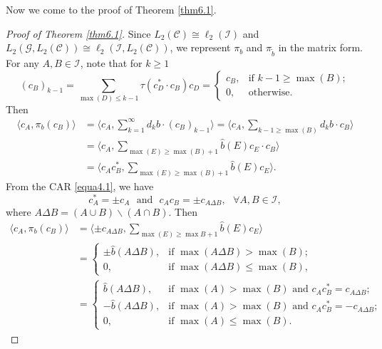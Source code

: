 \documentclass[oneside,english,a4wide]{amsart}
\numberwithin{equation}{section}
\numberwithin{figure}{section}
\theoremstyle{plain}
\theoremstyle{plain}
\theoremstyle{definition}
\theoremstyle{plain}
\theoremstyle{remark}
\theoremstyle{definition}
\theoremstyle{remark}
\theoremstyle{definition}
\newcommand{\8}{\infty}
\begin{document}
	Now we come to the proof of Theorem \ref{thm6.1}.
	\begin{proof}[Proof of Theorem \ref{thm6.1}]
		Since $L_2(\mathcal{C})\cong \ell_2(\mathcal{I})$ and $L_2(\mathcal{G},L_2(\mathcal{C}))\cong \ell_2(\mathcal{I}, L_2(\mathcal{C}))$, we represent $\pi_b$ and $\pi_{\tilde{b}}$ in the matrix form. For any $A,B\in\mathcal{I}$, note that for $k\geq 1$
		\begin{equation*}
			(c_B)_{k-1}=\sum_{\max(D)\le k-1}\tau(c_D^*\cdot c_B)c_D=
			\begin{cases}
				c_B,& \text{if $k-1\ge \max(B)$};\\
				0,& \text{otherwise}.
			\end{cases}
		\end{equation*}
		Then
		\begin{equation*}
			\begin{aligned}
				\langle c_A,\pi_b (c_B)\rangle{}&=\langle c_A,\sum_{k=1}^\infty d_kb\cdot(c_B)_{k-1}\rangle=\langle c_A,\sum_{k-1\ge \max(B)}d_kb\cdot c_B\rangle\\&=\langle c_A,\sum_{\max (E)\ge \max(B)+1}\hat{b}(E)c_E\cdot c_B\rangle\\&=\langle c_Ac_B^*,\sum_{\max (E)\ge \max(B)+1}\hat{b}(E)c_E\rangle.
			\end{aligned}
		\end{equation*}
		From the CAR \eqref{equa4.1}, we have 
		\[c_A^*=\pm c_A\,\,\,\,\mathrm{and}\,\,\,\,c_Ac_B=\pm c_{A\Delta B},\,\,\,\, \forall A,B\in\mathcal{I},\]
		where $A\Delta B=(A\cup B)\backslash(A\cap B)$. Then
		\begin{equation*}
			\begin{aligned}
				\langle c_A,\pi_b (c_B)\rangle{}&=\langle \pm c_{A\Delta B},\sum_{\max (E)\ge \max{B}+1}\hat{b}(E)c_E\rangle\\&=
				\begin{cases}
					\pm \hat{b}(A\Delta B),& \text{if $\max(A\Delta B)>\max (B)$};\\
					0,& \text{if $\max(A\Delta B)\le\max (B)$},
				\end{cases}\\&=
				\begin{cases}
					\hat{b}(A\Delta B),& \text{if $\max (A)>\max (B)$ and $c_Ac_B^*=c_{A\Delta B}$};\\
					- \hat{b}(A\Delta B),& \text{if $\max (A)>\max (B)$ and $c_Ac_B^*=-c_{A\Delta B}$};\\
					0,& \text{if $\max (A)\le\max (B)$}.
				\end{cases}

\end{aligned}
\end{equation*}
\end{proof}
\end{document}
